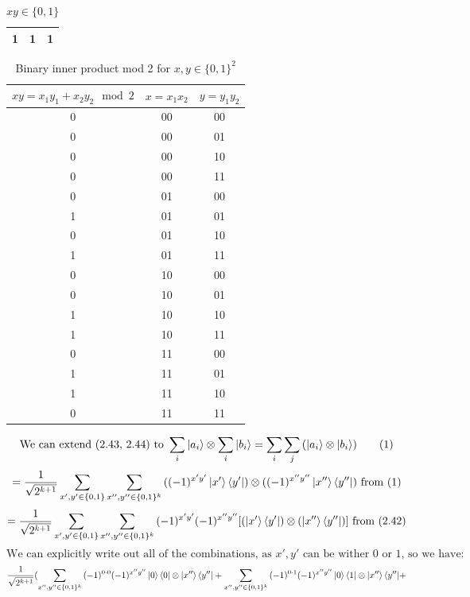 \documentclass{article}
\begin{document}
\begin{framed}
\begin{table}[H]
\begin{tabular}{|c|c|c|}
        1 & 1 & 1 \\
        \hline
    \end{tabular}
    \caption{$xy \in \{0,1\}$}
    \label{tab:binary_inner_product}
\end{table}
\begin{table}[H] 
    \centering
    \begin{tabular}{|c|c|c|}
        \hline
        $xy = x_1y_1 + x_2y_2 \mod 2$ & $x=x_1x_2$ & $y=y_1y_2$ \\ 
        \hline
        0 & 00 & 00 \\ 0 & 00 & 01 \\ 0 & 00 & 10 \\ 0 & 00 & 11 \\ 
        0 & 01 & 00 \\ 1 & 01 & 01 \\ 0 & 01 & 10 \\ 1 & 01 & 11 \\ 
        0 & 10 & 00 \\ 0 & 10 & 01 \\ 1 & 10 & 10 \\ 1 & 10 & 11 \\ 
        0 & 11 & 00 \\ 1 & 11 & 01 \\ 1 & 11 & 10 \\ 0 & 11 & 11 \\ 
        \hline
    \end{tabular}
    \caption{Binary inner product mod 2 for $x, y \in \{0,1\}^2$}
    \label{tab:binary_inner_product}
\end{table}
    \begin{equation}
        \text{We can extend (2.43, 2.44) to } \sum_{i}{\ket{a_i}} \otimes \sum_{i}{\ket{b_i}} = \sum_{i}\sum_{j}{(\ket{a_i} \otimes \ket{b_i})}
        \tag{1}
    \end{equation}
    $$
    = \frac{1}{\sqrt{2^{k+1}}}\sum_{x',y'\in\{0,1\}}\sum_{x'',y''\in\{0,1\}^k}{((-1)^{x'y'}\ket{x'}\bra{y'}) \otimes ((-1)^{x''y''}\ket{x''}\bra{y''})}
     \text{ from (1)}
    $$
    $$
    = \frac{1}{\sqrt{2^{k+1}}}\sum_{x',y'\in\{0,1\}}\sum_{x'',y''\in\{0,1\}^k}{(-1)^{x'y'}(-1)^{x''y''}[(\ket{x'}\bra{y'}) \otimes (\ket{x''}\bra{y''})]}
     \text{ from (2.42)}
    $$
    $$
    \text{We can explicitly write out all of the combinations, as } x',y' \text{ can be wither 0 or 1, so we have:} 
    $$
    $$
    \frac{1}{\sqrt{2^{k+1}}}(\sum_{x'',y''\in\{0,1\}^k}{(-1)^{0 \cdot 0}(-1)^{x''y''}\ket{0}\bra{0} \otimes \ket{x''}\bra{y''}} + \sum_{x'',y''\in\{0,1\}^k}{(-1)^{0 \cdot 1}(-1)^{x''y''}\ket{0}\bra{1} \otimes \ket{x''}\bra{y''}} +
$$
\end{framed}
\end{document}
